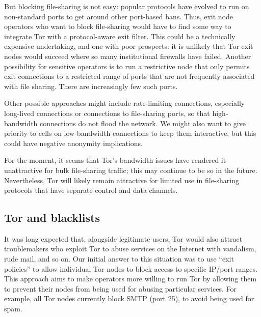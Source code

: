 \documentclass{llncs}
\begin{document}
But blocking file-sharing is not easy: popular
protocols have evolved to run on non-standard ports to
get around other port-based bans.  Thus, exit node operators who want to
block file-sharing would have to find some way to integrate Tor with a
protocol-aware exit filter.  This could be a technically expensive
undertaking, and one with poor prospects: it is unlikely that Tor exit nodes
would succeed where so many institutional firewalls have failed.  Another
possibility for sensitive operators is to run a restrictive node that
only permits exit connections to a restricted range of ports that are
not frequently associated with file sharing.  There are increasingly few such
ports.

Other possible approaches might include rate-limiting connections, especially
long-lived connections or connections to file-sharing ports, so that
high-bandwidth connections do not flood the network.  We might also want to
give priority to cells on low-bandwidth connections to keep them interactive,
but this could have negative anonymity implications.

For the moment, it seems that Tor's bandwidth issues have rendered it
unattractive for bulk file-sharing traffic; this may continue to be so in the
future.  Nevertheless, Tor will likely remain attractive for limited use in
file-sharing protocols that have separate control and data channels.



\subsection{Tor and blacklists}
\label{subsec:tor-and-blacklists}

It was long expected that, alongside legitimate users, Tor would also
attract troublemakers who exploit Tor to abuse services on the
Internet with vandalism, rude mail, and so on.
Our initial answer to this situation was to use ``exit policies''
to allow individual Tor nodes to block access to specific IP/port ranges.
This approach aims to make operators more willing to run Tor by allowing
them to prevent their nodes from being used for abusing particular
services.  For example, all Tor nodes currently block SMTP (port 25),
to avoid being used for spam.
\end{document}

